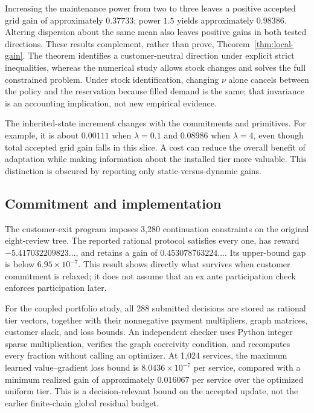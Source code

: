 Increasing the maintenance power from two to three leaves a positive accepted grid gain of approximately $0.37733$; power $1.5$ yields approximately $0.98386$. Altering dispersion about the same mean also leaves positive gains in both tested directions. These results complement, rather than prove, Theorem~\ref{thm:local-gain}. The theorem identifies a customer-neutral direction under explicit strict inequalities, whereas the numerical study allows stock changes and solves the full constrained problem. Under stock identification, changing $\nu$ alone cancels between the policy and the reservation because filled demand is the same; that invariance is an accounting implication, not new empirical evidence.

The inherited-state increment changes with the commitments and primitives. For example, it is about $0.00111$ when $\lambda=0.1$ and $0.08986$ when $\lambda=4$, even though total accepted grid gain falls in this slice. A cost can reduce the overall benefit of adaptation while making information about the installed tier more valuable. This distinction is obscured by reporting only static-versus-dynamic gains.

\subsection{Commitment and implementation}
The customer-exit program imposes 3,280 continuation constraints on the original eight-review tree. The reported rational protocol satisfies every one, has reward $-5.417032209823\ldots$, and retains a gain of $0.453078763224\ldots$. Its upper-bound gap is below $6.95\times10^{-7}$. This result shows directly what survives when customer commitment is relaxed; it does not assume that an ex ante participation check enforces participation later.

For the coupled portfolio study, all 288 submitted decisions are stored as rational tier vectors, together with their nonnegative payment multipliers, graph matrices, customer slack, and loss bounds. An independent checker uses Python integer sparse multiplication, verifies the graph coercivity condition, and recomputes every fraction without calling an optimizer. At 1,024 services, the maximum learned value--gradient loss bound is $8.0436\times10^{-7}$ per service, compared with a minimum realized gain of approximately $0.016067$ per service over the optimized uniform tier. This is a decision-relevant bound on the accepted update, not the earlier finite-chain global residual budget.

